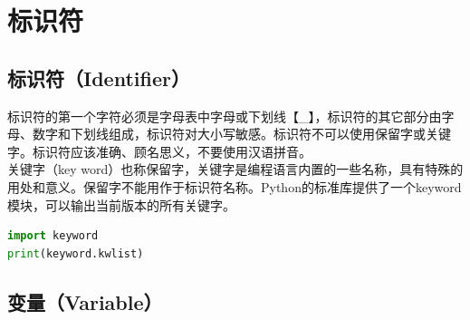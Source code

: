 \newpage

\section{标识符}

\subsection{标识符（Identifier）}

标识符的第一个字符必须是字母表中字母或下划线【\_】，标识符的其它部分由字母、数字和下划线组成，标识符对大小写敏感。标识符不可以使用保留字或关键字。标识符应该准确、顾名思义，不要使用汉语拼音。\\

关键字（key word）也称保留字，关键字是编程语言内置的一些名称，具有特殊的用处和意义。保留字不能用作于标识符名称。Python的标准库提供了一个keyword模块，可以输出当前版本的所有关键字。\\


\begin{lstlisting}[language=Python]
import keyword
print(keyword.kwlist)
\end{lstlisting}

\begin{table}[H]
	\centering
	\caption{关键字}
\end{table}

\vspace{0.5cm}

\subsection{变量（Variable）}

